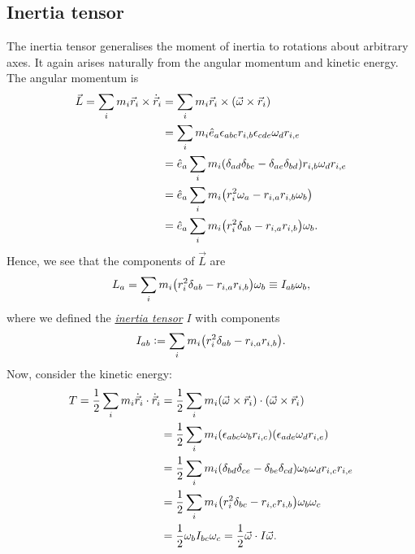 \documentclass{article}
\begin{document}
\subsection{Inertia tensor}
The inertia tensor generalises the moment of inertia to rotations about arbitrary axes. It again arises naturally from the angular momentum and kinetic energy. The angular momentum is
\begin{align}
    \begin{split}
        \vec{L} = \sum_i m_i \vec{r}_i \times \dot{\vec{r}}_i &= \sum_i m_i \vec{r}_i \times \qty(\vec{\omega} \times \vec{r}_i) \\
        &= \sum_i m_i \hat{e}_a \epsilon_{abc} r_{i,b} \epsilon_{cde} \omega_d r_{i,e} \\
        &= \hat{e}_a \sum_i m_i \qty(\delta_{ad}\delta_{be} - \delta_{ae}\delta_{bd}) r_{i,b} \omega_d r_{i,e} \\
        &= \hat{e}_a \sum_i m_i \qty(r_i^2 \omega_a - r_{i,a} r_{i,b} \omega_b) \\
        &= \hat{e}_a \sum_i m_i \qty(r_i^2 \delta_{ab} - r_{i,a} r_{i,b}) \omega_b.
    \end{split}
\end{align}
Hence, we see that the components of $\vec{L}$ are
\begin{equation}
    L_a = \sum_i m_i \qty(r_i^2 \delta_{ab} - r_{i,a} r_{i,b}) \omega_b \equiv I_{ab} \omega_b,
\end{equation}
where we defined the \href{https://en.wikipedia.org/wiki/Moment_of_inertia#Inertia_tensor}{\textit{inertia tensor}} $I$ with components
\begin{equation} \label{inertiatensor}
    I_{ab} \vcentcolon= \sum_i m_i \qty(r_i^2 \delta_{ab} - r_{i,a} r_{i,b}).
\end{equation}
Now, consider the kinetic energy:
\begin{align}
    \begin{split}
        T = \frac{1}{2} \sum_i m_i \dot{\vec{r}}_i \cdot \dot{\vec{r}}_i &= \frac{1}{2} \sum_i m_i \qty(\vec{\omega} \times \vec{r}_i) \cdot \qty(\vec{\omega} \times \vec{r}_i) \\
        &= \frac{1}{2} \sum_i m_i \qty(\epsilon_{abc} \omega_b r_{i,c}) \qty(\epsilon_{ade}\omega_d r_{i,e}) \\
        &= \frac{1}{2} \sum_i m_i \qty(\delta_{bd}\delta_{ce} - \delta_{be}\delta_{cd}) \omega_b \omega_d r_{i,c} r_{i,e} \\
        &= \frac{1}{2} \sum_i m_i \qty(r_i^2 \delta_{bc} - r_{i,c} r_{i,b}) \omega_b \omega_c \\
        &= \frac{1}{2} \omega_b I_{bc} \omega_c = \frac{1}{2} \vec{\omega} \cdot I \vec{\omega}.
    \end{split}
\end{align}
\end{document}
